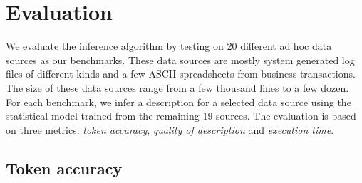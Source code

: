 \section{Evaluation}\label{sec:eval}

We evaluate the inference algorithm by testing on 20 different
ad hoc data sources as our benchmarks. These data sources are mostly system
generated log files of different kinds and a few ASCII spreadsheets
from business transactions. The size of these data sources range
from a few thousand lines to a few dozen. 
For each benchmark, we infer a description for a selected data source
using the statistical model trained from the remaining 19 sources. 
The evaluation is based on three metrics: {\em token accuracy},
{\em quality of description} and {\em execution time}.

\subsection{Token accuracy}
